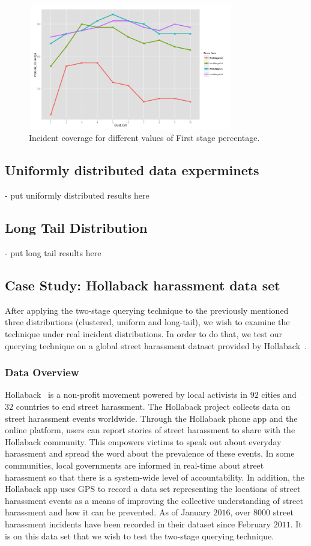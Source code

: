 \documentclass{acm_proc_article-sp}
\begin{document}
\begin{figure}[!h]
\centering
   \includegraphics[width=9cm ,height=5.5cm]{figuresPng/Coverage_Result.png}
   \caption{Incident coverage for different values of First stage percentage. }
   \label{fig: clustCoverage}
\end{figure}



\subsection{Uniformly distributed data experminets}
- put uniformly distributed results here


\subsection{Long Tail Distribution}
- put long tail results here

\subsection{Case Study: Hollaback harassment data set}
After applying the two-stage querying technique to the previously mentioned three distributions (clustered, uniform and long-tail), we wish to examine the technique under real incident distributions. In order to do that, we test our querying technique on a global street harassment dataset provided by Hollaback~\cite{hollaback}.

\subsubsection{Data Overview}
Hollaback~\cite{hollaback} is a non-profit movement powered by local activists in $92$ cities and $32$ countries to end street harassment. The Hollaback project collects data on street harassment events worldwide. Through the Hollaback phone app and the online platform, users can report stories of street harassment to share with the Hollaback community. This empowers victims to speak out about everyday harassment and spread the word about the prevalence of these events. In some communities, local governments are informed in real-time about street harassment so that there is a system-wide level of accountability. In addition, the Hollaback app uses GPS to record a data set representing the locations of street harassment events as a means of improving the collective understanding of street harassment and how it can be prevented.  As of January $2016$, over $8000$ street harassment incidents have been recorded in their dataset since February $2011$.  It is on this data set that we wish to test the two-stage querying technique.\par
\end{document}
